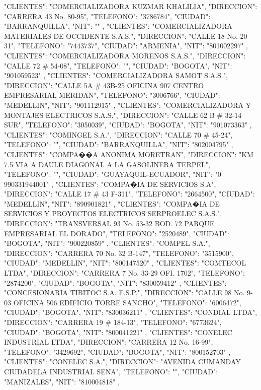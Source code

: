    {
   "CLIENTES": "COMERCIALIZADORA KUZMAR KHALILIA",
   "DIRECCION": "CARRERA 43 No. 80-95",
   "TELEFONO": "3786784",
   "CIUDAD": "BARRANQUILLA",
   "NIT": ""
   },
   {
   "CLIENTES": "COMERCIALIZADORA MATERIALES DE OCCIDENTE S.A.S.",
   "DIRECCION": "CALLE 18 No. 20-31",
   "TELEFONO": "7443737",
   "CIUDAD": "ARMENIA",
   "NIT": "801002297"
   },
   {
   "CLIENTES": "COMERCIALIZADORA MORENOS S.A.S.",
   "DIRECCION": "CALLE 72 # 54-08",
   "TELEFONO": "",
   "CIUDAD": "BOGOTA",
   "NIT": "901059523"
   },
   {
   "CLIENTES": "COMERCIALIZADORA SAMOT S.A.S.",
   "DIRECCION": "CALLE 5A # 43B-25 OFICINA 907 CENTRO EMPRESARIAL MERIDAN",
   "TELEFONO": "3006766",
   "CIUDAD": "MEDELLIN",
   "NIT": "901112915"
   },
   {
   "CLIENTES": "COMERCIALIZADORA Y MONTAJES ELECTRICOS S.A.S.",
   "DIRECCION": "CALLE 62 B # 32-14 SUR",
   "TELEFONO": "3050039",
   "CIUDAD": "BOGOTA",
   "NIT": "901073363"
   },
   {
   "CLIENTES": "COMINGEL S.A.",
   "DIRECCION": "CALLE 70 # 45-24",
   "TELEFONO": "",
   "CIUDAD": "BARRANQUILLA",
   "NIT": "802004795"
   },
   {
   "CLIENTES": "COMPA��A ANONIMA MORETRAN",
   "DIRECCION": "KM 7.5 VIA A DAULE DIAGONAL A LA GASOLINERA TERPEL",
   "TELEFONO": "",
   "CIUDAD": "GUAYAQUIL-ECUADOR",
   "NIT": "0 990331944001"
   },
   {
   "CLIENTES": "COMPA�IA DE SERVICIOS S.A",
   "DIRECCION": "CALLE 17 # 43 F-311",
   "TELEFONO": "2664500",
   "CIUDAD": "MEDELLIN",
   "NIT": "890901821"
   },
   {
   "CLIENTES": "COMPA�IA DE SERVICIOS Y PROYECTOS ELECTRICOS SERPROELEC S.A.S.",
   "DIRECCION": "TRANSVERSAL 93 No. 53-32 BOD. 72 PARQUE EMPRESARIAL EL DORADO",
   "TELEFONO": "2520489",
   "CIUDAD": "BOGOTA",
   "NIT": "900220859"
   },
   {
   "CLIENTES": "COMPEL S.A.",
   "DIRECCION": "CARRERA 70 No. 32 B-147",
   "TELEFONO": "3515900",
   "CIUDAD": "MEDELLIN",
   "NIT": "800147520"
   },
   {
   "CLIENTES": "COMTECOL LTDA",
   "DIRECCION": "CARRERA 7 No. 33-29 OFI. 1702",
   "TELEFONO": "2874200",
   "CIUDAD": "BOGOTA",
   "NIT": "830059412"
   },
   {
   "CLIENTES": "CONCESIONARIA TIBITOC S.A. E.S.P.",
   "DIRECCION": "CALLE 98 No. 9-03 OFICINA 506 EDIFICIO TORRE SANCHO",
   "TELEFONO": "6006472",
   "CIUDAD": "BOGOTA",
   "NIT": "830036211"
   },
   {
   "CLIENTES": "CONDIAL LTDA",
   "DIRECCION": "CARRERA 19 # 184-13",
   "TELEFONO": "6773624",
   "CIUDAD": "BOGOTA",
   "NIT": "800041221"
   },
   {
   "CLIENTES": "CONELEC INDUSTRIAL LTDA",
   "DIRECCION": "CARRERA 12 No. 16-99",
   "TELEFONO": "3429692",
   "CIUDAD": "BOGOTA",
   "NIT": "800152703"
   },
   {
   "CLIENTES": "CONELEC S.A.",
   "DIRECCION": "AVENIDA CUMANDAY CIUDADELA INDUSTRIAL SENA",
   "TELEFONO": "",
   "CIUDAD": "MANIZALES",
   "NIT": "810004818"
   },
